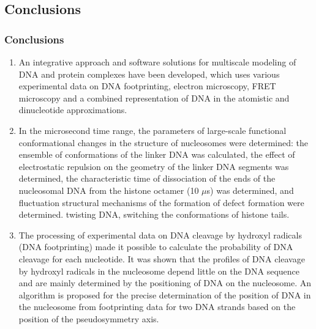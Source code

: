 \subsection{Conclusions}
\begin{frame}%
    \frametitle{Conclusions}

\begin{enumerate}
\justifying
\scriptsize
\item An integrative approach and software solutions for multiscale modeling of DNA and protein complexes have been developed, which uses various experimental data on DNA footprinting, electron microscopy, FRET microscopy and a combined representation of DNA in the atomistic and dinucleotide approximations.


  \item In the microsecond time range, the parameters of large-scale functional conformational changes in the structure of nucleosomes were determined: the ensemble of conformations of the linker DNA was calculated, the effect of electrostatic repulsion on the geometry of the linker DNA segments was determined, the characteristic time of dissociation of the ends of the nucleosomal DNA from the histone octamer (10 $\mu$s) was determined, and fluctuation structural mechanisms of the formation of defect formation were determined. twisting DNA, switching the conformations of histone tails.



  \item The processing of experimental data on DNA cleavage by hydroxyl radicals (DNA footprinting) made it possible to calculate the probability of DNA cleavage for each nucleotide. It was shown that the profiles of DNA cleavage by hydroxyl radicals in the nucleosome depend little on the DNA sequence and are mainly determined by the positioning of DNA on the nucleosome. An algorithm is proposed for the precise determination of the position of DNA in the nucleosome from footprinting data for two DNA strands based on the position of the pseudosymmetry axis.

\end{enumerate}
\end{frame}

